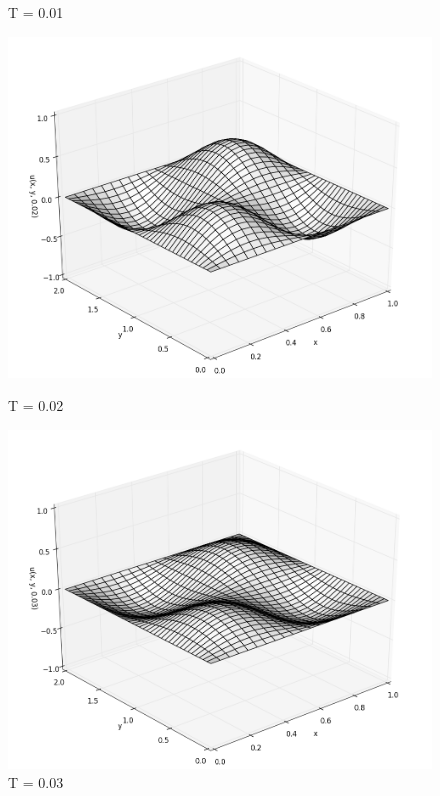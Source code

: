 \documentclass[12pt]{article}
\begin{document}
\begin{figure}[h!]
\begin{minipage}[h]{0.5\linewidth}
				\caption{T = 0.01}
			\end{minipage}
			\vfill
			\begin{minipage}[h]{0.5\linewidth}
				\includegraphics[width=\linewidth]{solution_t02}
				\caption{T = 0.02}
			\end{minipage}
			\hfill
			\begin{minipage}[h]{0.5\linewidth}
				\includegraphics[width=\linewidth]{solution_t03}
				\caption{T = 0.03}
			\end{minipage}
			\vfill
			\begin{minipage}[h]{0.5\linewidth}

\end{minipage}
\end{figure}
\end{document}
